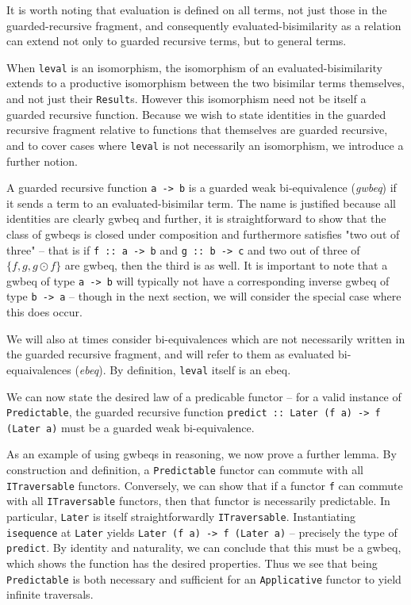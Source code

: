 \documentclass[sigplan,screen]{acmart}
\newcommand{\hs}{\texttt}
\begin{document}
It is worth noting that evaluation is defined on all terms, not just those in the guarded-recursive fragment, and consequently evaluated-bisimilarity as a relation can extend not only to guarded recursive terms, but to general terms.

When \hs{leval} is an isomorphism, the isomorphism of an evaluated-bisimilarity extends to a productive isomorphism between the two bisimilar terms themselves, and not just their \hs{Result}s. However this isomorphism need not be itself a guarded recursive function. Because we wish to state identities in the guarded recursive fragment relative to functions that themselves are guarded recursive, and to cover cases where \hs{leval} is not necessarily an isomorphism, we introduce a further notion.

A guarded recursive function \hs{a -> b} is a guarded weak bi-equivalence (\emph{gwbeq}) if it sends a term to an evaluated-bisimilar term. The name is justified because all identities are clearly gwbeq and further, it is straightforward to show that the class of gwbeqs is closed under composition and furthermore satisfies "two out of three" -- that is if  \hs{f :: a -> b} and \hs{g :: b -> c} and two out of three of $\{f, g, g \odot f\}$ are gwbeq, then the third is as well. It is important to note that a gwbeq of type \hs{a -> b} will typically not have a corresponding inverse gwbeq of type \hs{b -> a} -- though in the next section, we will consider the special case where this does occur.

We will also at times consider bi-equivalences which are not necessarily written in the guarded recursive fragment, and will refer to them as evaluated bi-equaivalences (\emph{ebeq}). By definition, \hs{leval} itself is an ebeq.
 
We can now state the desired law of a predicable functor -- for a valid instance of \hs{Predictable}, the guarded recursive function \hs{predict :: Later (f a) -> f (Later a)} must be a guarded weak bi-equivalence.
  
As an example of using gwbeqs in reasoning, we now prove a further lemma. By construction and definition, a \hs{Predictable} functor can commute with all \hs{ITraversable} functors. Conversely, we can show that if a functor \hs{f} can commute with all \hs{ITraversable} functors, then that functor is necessarily predictable. In particular, \hs{Later} is itself straightforwardly \hs{ITraversable}. Instantiating \hs{isequence} at \hs{Later} yields \hs{Later (f a) -> f (Later a)} -- precisely the type of \hs{predict}. By identity and naturality, we can conclude that this must be a gwbeq, which shows the function has the desired properties. Thus we see that being \hs{Predictable} is both necessary and sufficient for an \hs{Applicative} functor to yield infinite traversals.
 
\end{document}
